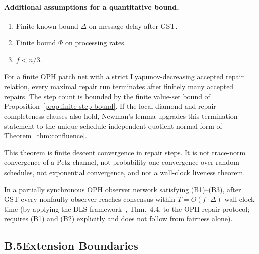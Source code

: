 \paragraph{Additional assumptions for a quantitative bound.}
\begin{enumerate}[(B1)]
  \item Finite known bound $\Delta$ on message delay after \textrm{GST}.
  \item Finite bound $\Phi$ on processing rates.
  \item $f < n/3$.
\end{enumerate}

\begin{theorem}
\label{thm:eventual-convergence}
For a finite OPH patch net with a strict Lyapunov-decreasing accepted repair relation, every
maximal repair run terminates after finitely many accepted repairs. The step count is bounded by
the finite value-set bound of Proposition~\ref{prop:finite-step-bound}. If the local-diamond and
repair-completeness clauses also hold, Newman's lemma upgrades this termination statement to the
unique schedule-independent quotient normal form of Theorem~\ref{thm:confluence}.

This theorem is finite descent convergence in repair steps. It is not trace-norm convergence of a
Petz channel, not probability-one convergence over random schedules, not exponential convergence,
and not a wall-clock liveness theorem.
\end{theorem}

\begin{theorem}
\label{thm:quantitative-convergence}
In a partially synchronous \textrm{OPH} observer network satisfying
(B1)--(B3), after \textrm{GST} every nonfaulty observer reaches consensus
within $T=O(f\cdot\Delta)$ wall-clock time
(by applying the \textrm{DLS} framework~\cite{DLS88}, Thm.~4.4,
to the \textrm{OPH} repair protocol;
requires (B1) and (B2) explicitly and does not follow from fairness alone).
\end{theorem}

\subsection*{B.5\quad Extension Boundaries}

